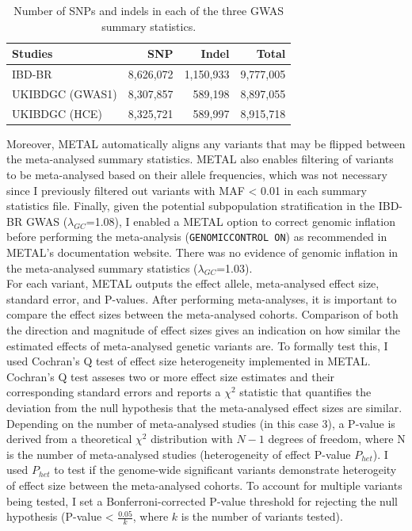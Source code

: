 \begin{table}[H]
  \caption{Number of SNPs and indels in each of the three GWAS summary statistics.}
  \centering
  \begin{tabular}[t]{lrrr}
  \toprule
  \textbf{Studies} & \textbf{SNP} & \textbf{Indel} & \textbf{Total}\\
  \midrule
  IBD-BR & 8,626,072 & 1,150,933 & 9,777,005\\
  UKIBDGC (GWAS1) & 8,307,857 & 589,198 & 8,897,055\\
  UKIBDGC (HCE) & 8,325,721 & 589,997 & 8,915,718\\
  \bottomrule
  \end{tabular}
  \end{table}

Moreover, METAL automatically aligns any variants that may be flipped between the meta-analysed summary statistics. METAL also enables filtering of variants to be meta-analysed based on their allele frequencies, which was not necessary since I previously filtered out variants with MAF < 0.01 in each summary statistics file. Finally, given the potential subpopulation stratification in the IBD-BR GWAS ($\lambda_{GC}$=1.08), I enabled a METAL option to correct genomic inflation before performing the meta-analysis (\Verb+GENOMICCONTROL ON+) as recommended in METAL's documentation website. There was no evidence of genomic inflation in the meta-analysed summary statistics ($\lambda_{GC}$=1.03).\\

For each variant, METAL outputs the effect allele, meta-analysed effect size, standard error, and P-values. After performing meta-analyses, it is important to compare the effect sizes between the meta-analysed cohorts. Comparison of both the direction and magnitude of effect sizes gives an indication on how similar the estimated effects of meta-analysed genetic variants are. To formally test this, I used Cochran's Q test of effect size heterogeneity implemented in METAL. Cochran's Q test asseses two or more effect size estimates and their corresponding standard errors and reports a $\chi^{2}$ statistic that quantifies the deviation from the null hypothesis that the meta-analysed effect sizes are similar. Depending on the number of meta-analysed studies (in this case 3), a P-value is derived from a theoretical $\chi^{2}$ distribution with $N-1$ degrees of freedom, where N is the number of meta-analysed studies (heterogeneity of effect P-value $P_{het}$). I used $P_{het}$ to test if the genome-wide significant variants demonstrate heterogeity of effect size between the meta-analysed cohorts. To account for multiple variants being tested, I set a Bonferroni-corrected P-value threshold for rejecting the null hypothesis (P-value < $\frac{0.05}{k}$, where $k$ is the number of variants tested).

